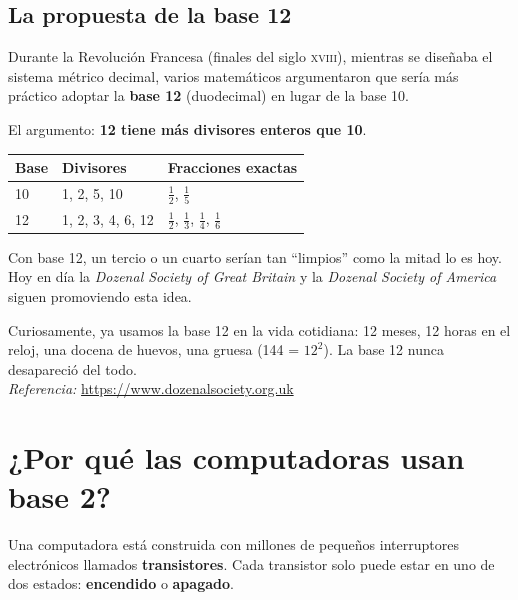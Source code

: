 \documentclass[12pt, oneside]{article}
\begin{document}
\subsection{La propuesta de la base 12}

Durante la Revolución Francesa (finales del siglo \textsc{xviii}), mientras
se diseñaba el sistema métrico decimal, varios matemáticos argumentaron que
sería más práctico adoptar la \textbf{base 12} (duodecimal) en lugar de la
base 10.

El argumento: \textbf{12 tiene más divisores enteros que 10}.

\begin{center}
\begin{tabular}{lll}
  \toprule
  \textbf{Base} & \textbf{Divisores} & \textbf{Fracciones exactas} \\
  \midrule
  10 & 1, 2, 5, 10           & $\frac{1}{2}$, $\frac{1}{5}$ \\[4pt]
  12 & 1, 2, 3, 4, 6, 12     & $\frac{1}{2}$, $\frac{1}{3}$, $\frac{1}{4}$, $\frac{1}{6}$ \\
  \bottomrule
\end{tabular}
\end{center}

Con base 12, un tercio o un cuarto serían tan ``limpios'' como la mitad lo es
hoy. Hoy en día la \textit{Dozenal Society of Great Britain} y la
\textit{Dozenal Society of America} siguen promoviendo esta idea.

\begin{consejo}
  Curiosamente, ya usamos la base 12 en la vida cotidiana: 12 meses,
  12 horas en el reloj, una docena de huevos, una gruesa (144 = $12^2$).
  La base 12 nunca desapareció del todo.\\
  \textit{Referencia:} \url{https://www.dozenalsociety.org.uk}
\end{consejo}

\section{¿Por qué las computadoras usan base 2?}

Una computadora está construida con millones de pequeños interruptores
electrónicos llamados \textbf{transistores}. Cada transistor solo puede
estar en uno de dos estados: \textbf{encendido} o \textbf{apagado}.
\end{document}
